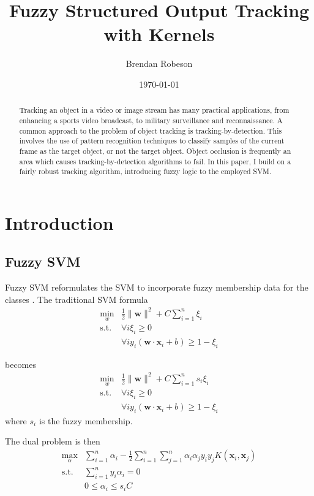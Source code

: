 \documentclass{IEEEtran}
\begin{document}
\title{Fuzzy Structured Output Tracking with Kernels}
\author{Brendan Robeson}
\date{\today}
\maketitle

\begin{abstract}
    Tracking an object in a video or image stream has many practical applications, from enhancing a
    sports video broadcast, to military surveillance and reconnaissance. A common approach to the
    problem of object tracking is tracking-by-detection. This involves the use of pattern
    recognition techniques to classify samples of the current frame as the target object, or not the
    target object. Object occlusion is frequently an area which causes tracking-by-detection
    algorithms to fail. In this paper, I build on a fairly robust tracking algorithm, introducing
    fuzzy logic to the employed SVM.
\end{abstract}

\section{Introduction}
\subsection{Fuzzy SVM} %
Fuzzy SVM reformulates the SVM to incorporate fuzzy membership data for the classes \cite{991432}. The
traditional SVM formula
\begin{align}
    \min_w & \frac{1}{2}\|\textbf{w}\|^2 + C\sum_{i=1}^n\xi_i \\
    \text{s.t. } & \forall i \xi_i \ge 0 \nonumber \\
                 & \forall i y_i \left(\textbf{w} \cdot \textbf{x}_i + b\right) \ge 1 - \xi_i \nonumber
\end{align}

becomes
\begin{align}
    \min_w & \frac{1}{2}\|\textbf{w}\|^2 + C\sum_{i=1}^ns_i\xi_i \\
    \text{s.t. } & \forall i \xi_i \ge 0 \nonumber \\
                 & \forall i y_i \left(\textbf{w} \cdot \textbf{x}_i + b\right) \ge 1 - \xi_i \nonumber
\end{align}
where \(s_i\) is the fuzzy membership.

The dual problem is then
\begin{align}
    \max_\alpha & \sum_{i=1}^n \alpha_i - \frac{1}{2} \sum_{i=1}^n \sum_{j=1}^n \alpha_i \alpha_j
    y_i y_j K\left(\textbf{x}_i, \textbf{x}_j\right) \\
    \text{s.t. } & \sum_{i=1}^n y_i \alpha_i = 0 \nonumber \\
                 & 0 \le \alpha_i \le s_iC \nonumber
\end{align}
\end{document}
